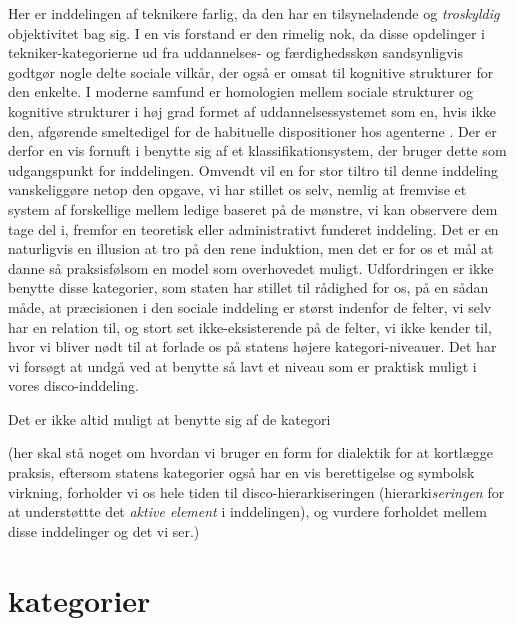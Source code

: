 Her er inddelingen af teknikere farlig, da den har en tilsyneladende og \emph{troskyldig} objektivitet bag sig. I en vis forstand er den rimelig nok, da disse opdelinger i tekniker-kategorierne ud fra uddannelses- og færdighedsskøn sandsynligvis godtgør nogle delte sociale vilkår, der også er omsat til kognitive strukturer for den enkelte. I moderne samfund er homologien mellem sociale strukturer og kognitive strukturer i høj grad formet af uddannelsessystemet som en, hvis ikke den, afgørende smeltedigel for de habituelle dispositioner hos agenterne \parencite[12]{Bourdieu1992}. Der er derfor en vis fornuft i benytte sig af et klassifikationsystem, der bruger dette som udgangspunkt for inddelingen. Omvendt vil en for stor tiltro til denne inddeling vanskeliggøre netop den opgave, vi har stillet os selv, nemlig at fremvise et system af forskellige mellem ledige baseret på de mønstre, vi kan observere dem tage del i, fremfor en teoretisk eller administrativt funderet inddeling. Det er en naturligvis en illusion at tro på den rene induktion, men det er for os et mål at danne så praksisfølsom en model som overhovedet muligt. Udfordringen er ikke benytte disse kategorier, som staten har stillet til rådighed for os, på en sådan måde, at præcisionen i den sociale inddeling er størst indenfor de felter, vi selv har en relation til, og stort set ikke-eksisterende på de felter, vi ikke kender til, hvor vi bliver nødt til at forlade os på statens højere kategori-niveauer. Det har vi forsøgt at undgå ved at benytte så lavt et niveau som er praktisk muligt i vores disco-inddeling. 



Det er ikke altid muligt at benytte sig af de kategori

(her skal stå noget om hvordan vi bruger en form for dialektik for at kortlægge praksis, eftersom statens kategorier også har en vis berettigelse og symbolsk virkning, forholder vi os hele tiden til disco-hierarkiseringen (hierarki\emph{seringen} for at understøttte det \emph{aktive element} i inddelingen), og vurdere forholdet mellem disse inddelinger og det vi ser.)



\section{kategorier \label{}}

